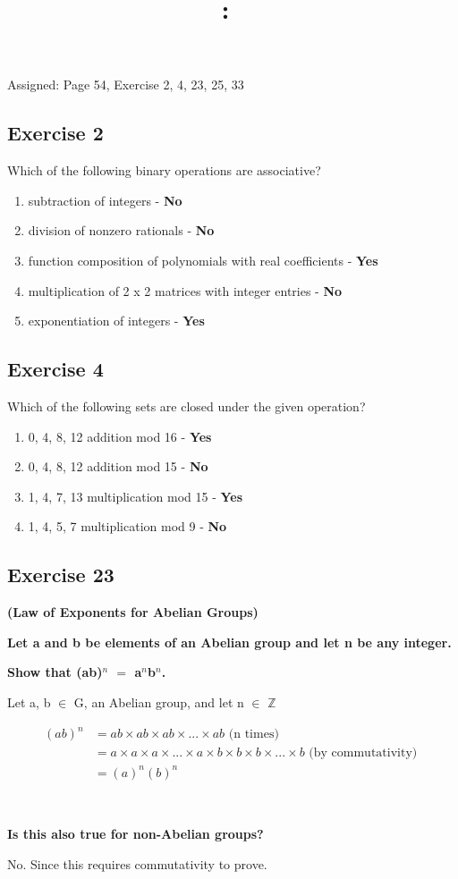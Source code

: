\documentclass{article}
\title{
    \vspace{2in}
    \textmd{\textbf{\hmwkClass:\ \hmwkTitle}}\\
    \normalsize\vspace{0.1in}\small\vspace{0.1in}\large{\textit{\hmwkClassInstructor}}
    \vspace{3in}
}
\author{\hmwkAuthorName}
\date{}
\newcommand{\mt}[1]{\ensuremath{#1}}
\newcommand\ssc[2][\DefaultOpt]{%
  \def\DefaultOpt{#2}%
  \subsection[#1]{#2}%
}
\newcommand{\balist}{\begin{enumerate}[label=\alph*.]}
\newcommand{\elist}{\end{enumerate}}
\newcommand{\bz}{\mt{\mathbb{Z}} }       %
\newcommand{\mem}{\mt{\in} }
\newcommand{\eql}{\mt{=} }
\newcommand{\uf}[2]{#1\mt{^{#2}}}
\newcommand{\eqn}[1]{\[#1\]}
\newcommand{\splt}[1]{\begin{split}#1\end{split}}
\begin{document}
Assigned: Page 54, Exercise 2, 4, 23, 25, 33

\ssc{Exercise 2}{

Which of the following binary operations are associative?
\balist
\item subtraction of integers - \textbf{No}
\item division of nonzero rationals - \textbf{No}
\item function composition of polynomials with real coefficients - \textbf{Yes}
\item multiplication of 2 x 2 matrices with integer entries - \textbf{No}
\item exponentiation of integers - \textbf{Yes}
\elist

}

\ssc{Exercise 4}{
Which of the following sets are closed under the given operation?
\balist
\item {0, 4, 8, 12} addition mod 16 - \textbf{Yes}
\item {0, 4, 8, 12} addition mod 15 - \textbf{No}
\item {1, 4, 7, 13} multiplication mod 15 - \textbf{Yes}
\item {1, 4, 5, 7} multiplication mod 9 - \textbf{No}
\elist

}

\ssc{Exercise 23}{

\textbf{(Law of Exponents for Abelian Groups)}

\textbf{Let a and b be elements of an Abelian group and let n be any integer.}

\textbf{Show that \uf{(ab)}{n} \eql \uf{a}{n}\uf{b}{n}.}

Let a, b \mem G, an Abelian group, and let n \mem \bz

\eqn{
	\splt{
		(ab)^n & = ab \times  ab \times ab \times... \times ab \textrm{ (n times) } \\
		& = a \times a \times a \times ... \times a \times b \times b \times b \times ... \times b \textrm{ (by commutativity) } \\
		& = (a)^n(b)^n
	}
}

\

\textbf{Is this also true for non-Abelian groups?}

No. Since this requires commutativity to prove.
}
\end{document}
